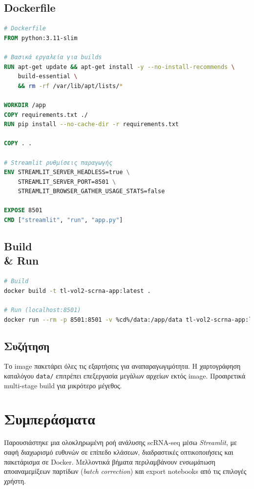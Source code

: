 \documentclass[12pt,a4paper]{article}
\begin{document}
\subsection{Dockerfile}
\begin{lstlisting}[language=Dockerfile]
# Dockerfile
FROM python:3.11-slim

# Βασικά εργαλεία για builds
RUN apt-get update && apt-get install -y --no-install-recommends \
    build-essential \
    && rm -rf /var/lib/apt/lists/*

WORKDIR /app
COPY requirements.txt ./
RUN pip install --no-cache-dir -r requirements.txt

COPY . .

# Streamlit ρυθμίσεις παραγωγής
ENV STREAMLIT_SERVER_HEADLESS=true \
    STREAMLIT_SERVER_PORT=8501 \
    STREAMLIT_BROWSER_GATHER_USAGE_STATS=false

EXPOSE 8501
CMD ["streamlit", "run", "app.py"]
\end{lstlisting}

\subsection{Build \\& Run}
\begin{lstlisting}[language=bash]
# Build
docker build -t tl-vol2-scrna-app:latest .

# Run (localhost:8501)
docker run --rm -p 8501:8501 -v %cd%/data:/app/data tl-vol2-scrna-app:latest
\end{lstlisting}

\subsection{Συζήτηση}
Το image πακετάρει όλες τις εξαρτήσεις για αναπαραγωγιμότητα. Η χαρτογράφηση καταλόγου \texttt{data/} επιτρέπει επεξεργασία μεγάλων αρχείων εκτός image. Προαιρετικά multi-stage build για μικρότερο μέγεθος.

\section{Συμπεράσματα}
Παρουσιάστηκε μια ολοκληρωμένη ροή ανάλυσης scRNA\nobreakdash-seq μέσω \textit{Streamlit}, με σαφή διαχωρισμό ευθυνών σε επίπεδο κλάσεων, διαδραστικές οπτικοποιήσεις και πακετάρισμα σε Docker. Μελλοντικά βήματα περιλαμβάνουν ενσωμάτωση αποαναμεμίξεων παρτίδων (\textit{batch correction}) και export notebooks από τις επιλογές χρήστη.

\printbibliography
\end{document}
